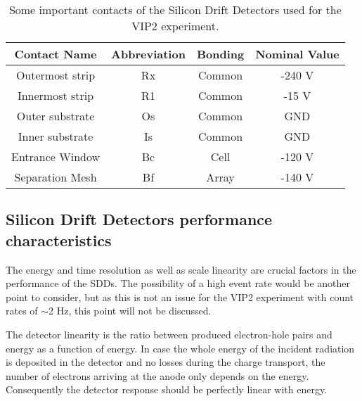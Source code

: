 \begin{table}[h]
 \centering
  \begin{tabular}{|c|c|c|c|}
  \hline
  Contact Name & Abbreviation & Bonding & Nominal Value \cite{Lechner}\\
  \hline
  \hline
  Outermost strip & Rx & Common & -240 V\\
  \hline
  Innermost strip & R1 & Common & -15 V\\
  \hline
  Outer substrate & Os & Common & GND\\
  \hline
  Inner substrate & Is & Common & GND \\
  \hline
  Entrance Window & Bc & Cell & -120 V \\
  \hline
  Separation Mesh & Bf & Array & -140 V \\
  \hline
  \end{tabular}
    \caption{Some important contacts of the Silicon Drift Detectors used for the VIP2 experiment.}
  \label{tab:sddContacts}
\end{table}

\subsection{Silicon Drift Detectors performance characteristics}

The energy and time resolution as well as scale linearity are crucial factors in the performance of the SDDs. The possibility of a high event rate would be another point to consider, but as this is not an issue for the VIP2 experiment with count rates of $\sim$2 Hz, this point will not be discussed. 

The detector linearity is the ratio between produced electron-hole pairs and energy as a function of energy. In case the whole energy of the incident radiation is deposited in the detector and no losses during the charge transport, the number of electrons arriving at the anode only depends on the energy. Consequently the detector response should be perfectly linear with energy.

